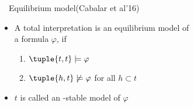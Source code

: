 \begin{frame}{\HTC\ \ Equilibrium model}{(Cabalar et al'16)}
  \begin{itemize}
  \item A total interpretation  is an \alert{equilibrium model} of\\
    a formula $\varphi$,
    if
    \par
    \smallskip
    \begin{enumerate}\normalsize
    \item
      \(
      \tuple{t,t}\models\varphi
      \)
    \item
      \(
      \tuple{h,t}\not\models\varphi
      \)
      for all $h\subset t$
    \end{enumerate}
    \smallskip
  \item <2-> $t$ is called an \HTC-\alert{stable model} of $\varphi$
  \end{itemize}
\end{frame}
%
